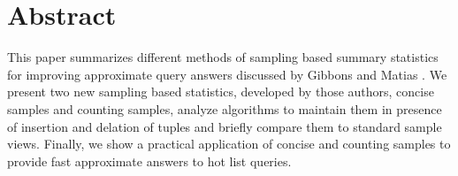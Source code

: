 \section{Abstract}
This paper summarizes different methods of sampling based summary
statistics for improving approximate query answers discussed by Gibbons and Matias
\cite{GM98}. We present two new sampling based statistics, developed by
those authors, concise samples and counting samples, analyze algorithms to
maintain them in presence of insertion and delation of tuples and
briefly compare them to standard sample views.
Finally, we show a practical application of concise and counting
samples to provide fast approximate answers to hot list queries.

